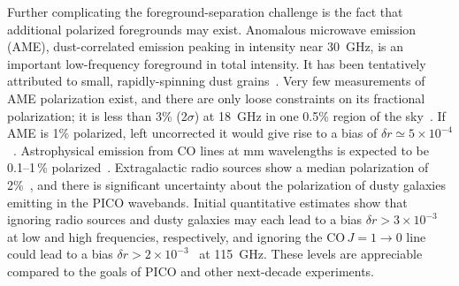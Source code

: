 \documentclass[PICOReport.tex]{subfiles}
\begin{document}

Further complicating the foreground-separation challenge is the fact that additional polarized foregrounds may exist.  
Anomalous microwave emission (AME), dust-correlated emission peaking in intensity near 30~GHz, is an important low-frequency foreground in total intensity. 
It has been tentatively attributed to small, rapidly-spinning dust grains~\citep{dickinson/etal:2018}. Very few measurements of AME polarization exist, and there are only loose constraints on its fractional polarization; it is less than 3\% (2$\sigma$) at 18~GHz in one 0.5\% region of the sky~\citep{genova_santos:2015}.  If AME is 1\% polarized, left uncorrected it would give rise to a bias of $\delta r \simeq 5\times10^{-4}$~\citep{remazeilles2016}.  Astrophysical emission from CO lines at mm wavelengths is expected to be 0.1--1\,\% polarized~\citep{greeves1999, puglisi2017}.  Extragalactic radio sources show a median polarization of 2\%~\citep{Bonavera2018, puglisi2018_polsource, trombetti2018_fracpol}, and there is significant uncertainty about the polarization of dusty galaxies emitting in the PICO wavebands. Initial quantitative estimates show that ignoring radio sources and dusty galaxies may each lead to a bias $\delta r > 3\times10^{-3}$~\citep{toffolatti2012,Bonavera2018,remazeilles2018}  %
at low and high frequencies, respectively, and ignoring the CO\,$J=1\rightarrow0$ line could lead to a bias $\delta r > 2\times10^{-3}$~\citep{puglisi2017} at 115~GHz. %
These levels are appreciable compared to the goals of PICO and other next-decade experiments. 
\end{document}
